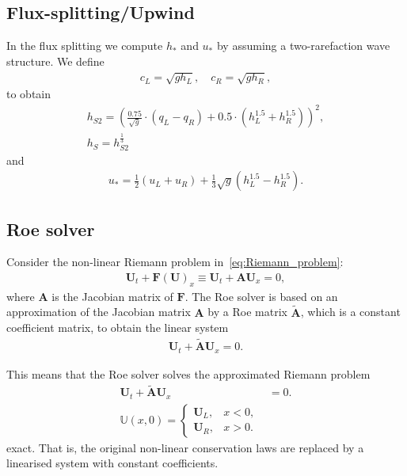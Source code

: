 \subsection{Flux-splitting/Upwind}
In the flux splitting we compute $h_*$ and $u_*$ by assuming a two-rarefaction wave structure.
We define 
\begin{align*}
    c_L = \sqrt{g h_L}, \quad c_R = \sqrt{g h_R},
\end{align*}
to obtain
\begin{align*}
    h_{S2} = {\left( \frac{0.75}{\sqrt{g}} \cdot (q_L - q_R) + 0.5 \cdot \left(h_L^{1.5} + h_R^{1.5}\right) \right)}^2, \\
    h_{S} = h_{S2}^{\frac{1}{3}}
\end{align*}
and
\begin{align*}
    u_* = \frac{1}{2} (u_L + u_R) + \frac{1}{3} \sqrt{g} (h_L^{1.5} - h_R^{1.5}).
\end{align*}




\subsection{Roe solver}
Consider the non-linear Riemann problem in~\eqref{eq:Riemann_problem}:
\begin{align*}
    \mathbf{U}_t + \mathbf{F(U)}_x \equiv \mathbf{U}_t + \mathbf{A} \mathbf{U}_x = 0,
\end{align*}
where $\mathbf{A}$ is the Jacobian matrix of $\mathbf{F}$. 
The Roe solver is based on an approximation of the Jacobian matrix $\mathbf{A}$ by a Roe matrix $\tilde{\mathbf{A}}$, which is a constant coefficient matrix, to obtain the linear system
\begin{align*}
    \mathbf{U}_t + \mathbf{\tilde{A}} \mathbf{U}_x = 0.
\end{align*}

This means that the Roe solver solves the approximated Riemann problem
\begin{align*}
    \mathbf{U}_t + \mathbf{\tilde{A}} \mathbf{U}_x &= 0. \\
    \mathbb{U}(x,0) = \begin{cases}
        \mathbf{U}_L, & x < 0, \\
        \mathbf{U}_R, & x > 0.
    \end{cases}
\end{align*}
exact.
That is, the original non-linear conservation laws are replaced by a linearised system with constant coefficients.

